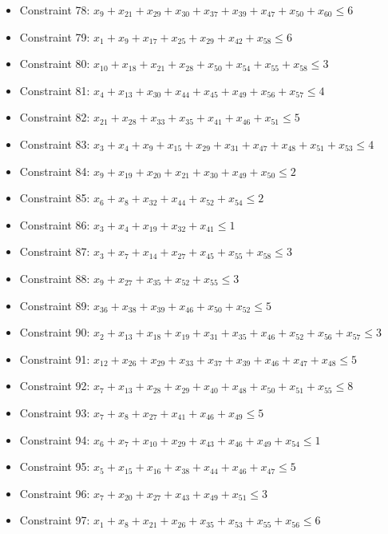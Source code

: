 \documentclass[11pt]{article}
\begin{document}
\begin{itemize}
\item Constraint 78: $x_{9} + x_{21} + x_{29} + x_{30} + x_{37} + x_{39} + x_{47} + x_{50} + x_{60} \le 6$
\item Constraint 79: $x_{1} + x_{9} + x_{17} + x_{25} + x_{29} + x_{42} + x_{58} \le 6$
\item Constraint 80: $x_{10} + x_{18} + x_{21} + x_{28} + x_{50} + x_{54} + x_{55} + x_{58} \le 3$
\item Constraint 81: $x_{4} + x_{13} + x_{30} + x_{44} + x_{45} + x_{49} + x_{56} + x_{57} \le 4$
\item Constraint 82: $x_{21} + x_{28} + x_{33} + x_{35} + x_{41} + x_{46} + x_{51} \le 5$
\item Constraint 83: $x_{3} + x_{4} + x_{9} + x_{15} + x_{29} + x_{31} + x_{47} + x_{48} + x_{51} + x_{53} \le 4$
\item Constraint 84: $x_{9} + x_{19} + x_{20} + x_{21} + x_{30} + x_{49} + x_{50} \le 2$
\item Constraint 85: $x_{6} + x_{8} + x_{32} + x_{44} + x_{52} + x_{54} \le 2$
\item Constraint 86: $x_{3} + x_{4} + x_{19} + x_{32} + x_{41} \le 1$
\item Constraint 87: $x_{3} + x_{7} + x_{14} + x_{27} + x_{45} + x_{55} + x_{58} \le 3$
\item Constraint 88: $x_{9} + x_{27} + x_{35} + x_{52} + x_{55} \le 3$
\item Constraint 89: $x_{36} + x_{38} + x_{39} + x_{46} + x_{50} + x_{52} \le 5$
\item Constraint 90: $x_{2} + x_{13} + x_{18} + x_{19} + x_{31} + x_{35} + x_{46} + x_{52} + x_{56} + x_{57} \le 3$
\item Constraint 91: $x_{12} + x_{26} + x_{29} + x_{33} + x_{37} + x_{39} + x_{46} + x_{47} + x_{48} \le 5$
\item Constraint 92: $x_{7} + x_{13} + x_{28} + x_{29} + x_{40} + x_{48} + x_{50} + x_{51} + x_{55} \le 8$
\item Constraint 93: $x_{7} + x_{8} + x_{27} + x_{41} + x_{46} + x_{49} \le 5$
\item Constraint 94: $x_{6} + x_{7} + x_{10} + x_{29} + x_{43} + x_{46} + x_{49} + x_{54} \le 1$
\item Constraint 95: $x_{5} + x_{15} + x_{16} + x_{38} + x_{44} + x_{46} + x_{47} \le 5$
\item Constraint 96: $x_{7} + x_{20} + x_{27} + x_{43} + x_{49} + x_{51} \le 3$
\item Constraint 97: $x_{1} + x_{8} + x_{21} + x_{26} + x_{35} + x_{53} + x_{55} + x_{56} \le 6$

\end{itemize}
\end{document}
